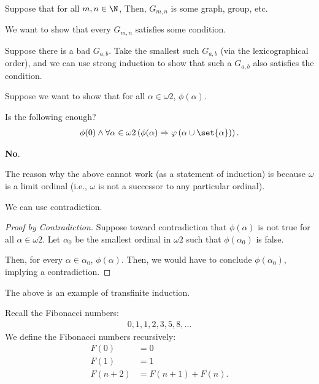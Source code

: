 \documentclass[10pt]{mypackage}
\begin{document}
\begin{example}
  Suppose that for all $m,n\in \N$, Then, $G_{m,n}$ is some graph, group, etc.\newline

  We want to show that every $G_{m,n}$ satisfies some condition.\newline

  Suppose there is a bad $G_{a,b}$. Take the smallest such $G_{a,b}$ (via the lexicographical order), and we can use strong induction to show that such a $G_{a,b}$ also satisfies the condition.
\end{example}
\begin{example}
  Suppose we want to show that for all $\alpha \in \omega2$, $\phi(\alpha)$. 
  \begin{question}
    Is the following enough?
    \begin{align*}
      \phi(0) \wedge \forall \alpha \in \omega 2\left(\phi(\alpha)\Rightarrow \varphi\left(\alpha\cup \set{\alpha}\right)\right).
    \end{align*}
  \end{question}
  \begin{answer}
    \textbf{No}.
  \end{answer}
  The reason why the above cannot work (as a statement of induction) is because $\omega$ is a limit ordinal (i.e., $\omega$ is not a successor to any particular ordinal).\newline

  We can use contradiction.
  \begin{proof}[Proof by Contradiction]
    Suppose toward contradiction that $\phi(\alpha)$ is not true for all $\alpha \in \omega2$. Let $\alpha_0$ be the smallest ordinal in $\omega 2$ such that $\phi\left(\alpha_0\right)$ is false.\newline

    Then, for every $\alpha \in \alpha_0$, $\phi(\alpha)$. Then, we would have to conclude $\phi\left(\alpha_0\right)$, implying a contradiction.
  \end{proof}
  The above is an example of transfinite induction.
\end{example}
\begin{example}[Recursion]
  Recall the Fibonacci numbers:
  \begin{align*}
    0,1,1,2,3,5,8,\dots
  \end{align*}
  We define the Fibonacci numbers recursively:
  \begin{align*}
    F(0) &= 0\\
    F(1) &= 1\\
    F(n+2) &= F(n+1) + F(n).
  \end{align*}
\end{example}
\end{document}
